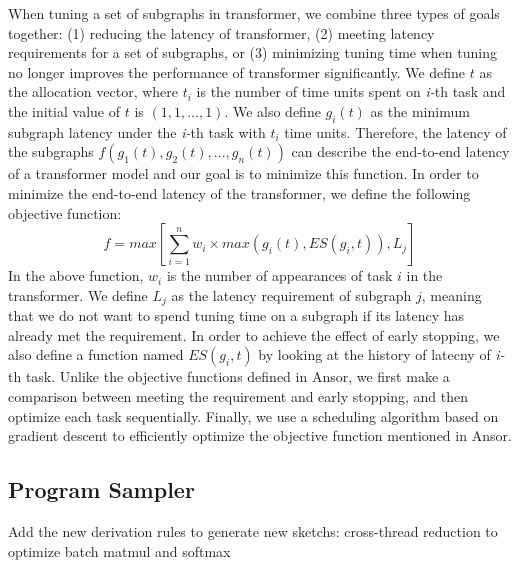 When tuning a set of subgraphs in transformer, we combine three types of goals together: (1) reducing the latency of transformer, (2) meeting latency requirements
for a set of subgraphs, or (3) minimizing tuning time when tuning no longer improves the performance of transformer significantly. We define $t$ as the allocation
vector, where $t_i$ is the number of time units spent on \textit{i-}th task and the initial value of $t$ is $(1, 1, ..., 1)$. We also define $g_{i}(t)$ as the minimum subgraph latency under the \textit{i-}th task
with $t_i$ time units. Therefore, the latency of the subgraphs $f(g_{1}(t), g_{2}(t), ..., g_{n}(t))$ can describe the end-to-end latency of a transformer model and our
goal is to minimize this function. In order to minimize the end-to-end latency of the transformer, we define the following objective function:
\begin{equation}
    f =  max \left[\sum\limits_{i = 1}^{n} w_{i} \times max(g_{i}(t), ES(g_{i}, t)), L_{j} \right] 
\end{equation}
In the above function, $w_i$ is the number of appearances of task $i$ in the transformer. We define $L_{j}$ as the latency requirement of subgraph $j$, meaning that we do not want to spend tuning time on a subgraph if its latency 
has already met the requirement. In order to achieve the effect of early stopping, we also define a function named ${ES(g_i, t)}$ by looking at the history of latecny
of \textit{i-}th task. Unlike the objective functions defined in Ansor, we first make a comparison between meeting the requirement and early stopping, and then optimize
each task sequentially. Finally, we use a scheduling algorithm based on gradient descent to efficiently optimize the objective function mentioned in Ansor.


\subsection{Program Sampler}

{\color{red} Add the new derivation rules to generate new sketchs:
cross-thread reduction to optimize batch matmul and softmax}

